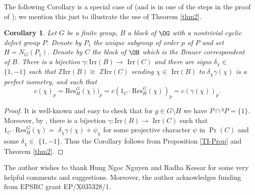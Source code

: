 \documentclass{amsart} %
\theoremstyle{plain}\newtheorem{Theorem}{Theorem}[section]
\theoremstyle{plain}\newtheorem{Conjecture}[Theorem]{Conjecture}
\theoremstyle{plain}\newtheorem{Corollary}[Theorem]{Corollary}
\theoremstyle{plain}\newtheorem{Lemma}[Theorem]{Lemma}
\theoremstyle{plain}\newtheorem{Proposition}[Theorem]{Proposition}
\theoremstyle{definition}\newtheorem{Definition}[Theorem]{Definition}
\theoremstyle{definition}\newtheorem{Example}[Theorem]{Example}
\theoremstyle{definition}\newtheorem{Examples}[Theorem]{Examples}
\theoremstyle{definition}\newtheorem{Remark}[Theorem]{Remark}
\theoremstyle{definition}\newtheorem{Remarks}[Theorem]{Remarks}
\theoremstyle{plain}\newtheorem{Statement}[Theorem]{}
\def\Z{{\mathbb Z}}
\def\Irr{\mathrm{Irr}}           \def\tenK{\otimes_K}
\def\Res{\mathrm{Res}}           \def\tenOR{\otimes_{\mathcal{O}R}}
\begin{document}
The following  Corollary is a special case of \cite[Theorem C]{HungFry}
(and is in  one of the steps in the proof of \cite[Theorem 3.4]{HungFry});
we mention this just  to illustrate the use of Theorem \ref{thm2}.

\begin{Corollary} \label{cyclic-Cor}
Let $G$ be a finite group, $B$ a block of $\OG$ with a nontrivial cyclic 
defect group $P$. Denote by $P_1$ the unique subgroup of order $p$ of $P$
and set $H=N_G(P_1)$. Denote by $C$ the block of $\OH$ which is the Brauer
correspondent of $B$. There is a bijection $\gamma : \Irr(B)\to$ $\Irr(C)$ 
and there are signs $\delta_\chi\in$ $\{1,-1\}$ such that 
$\Z\Irr(B)\cong$ $\Z\Irr(C)$ sending $\chi\in$ $\Irr(B)$ to $\delta_\chi\gamma(\chi)$
is a perfect isometry, and such that
$$c(\chi)_p= \Res^G_H(\chi))_p =  c(1_C\cdot \Res^G_H(\chi))_p = c(\gamma(\chi))_p.$$
\end{Corollary}

\begin{proof}
It is well-known and easy to check that for $g\in G\setminus H$ we have
$P\cap {^gP} = \{1\}$. Moreover, by
\cite[Theorem 11.10.2]{LiBookII}, 
there is a bijection $\gamma : \Irr(B)\to$ $\Irr(C)$ such that
$1_C\cdot \Res^G_H(\chi) =$ $\delta_\chi\gamma(\chi) + \psi_\chi$ for some
projective character $\psi$  in $\Pr(C)$ and some $\delta_\chi\in$ $\{1,-1\}$.
Thus the Corollary follows from Proposition \ref{TI-Prop} and Theorem \ref{thm2}.
\end{proof}


\bigskip{} 
The author wishes to thank Hung Ngoc Nguyen and  Radha Kessar
for some very helpful comments and suggestions.
Moreover, the author acknowledges funding from EPSRC grant EP/X035328/1.
\end{document}
